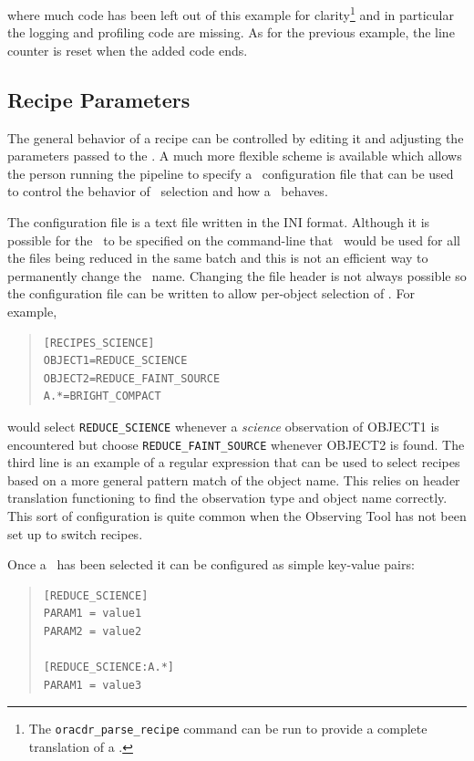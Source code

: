 \documentclass[final,authoryear,5p,times,twocolumn]{elsarticle}
\begin{document}
where much code has been left out of this example for
clarity\footnote{The \texttt{oracdr\_parse\_recipe} command can be run
to provide a complete translation of a \recipe.} and in particular the
logging and profiling code are missing. As for the previous example,
the line counter is reset when the added code ends.

\subsection{Recipe Parameters}

The general behavior of a recipe can be controlled by editing it and
adjusting the parameters passed to the \primitives. A much more
flexible scheme is available which allows the person running the
pipeline to specify a \recipe\ configuration file that can be used to
control the behavior of \recipe\ selection and how a \recipe\ behaves.

The configuration file is a text file written in the INI
format. Although it is possible for the \recipe\ to be specified on
the command-line that \recipe\ would be used for all the files being
reduced in the same batch and this is not an efficient way to
permanently change the \recipe\ name. Changing the file header is not
always possible so the configuration file can be written to allow
per-object selection of \recipes. For example,

\begin{quote}
\begin{verbatim}
[RECIPES_SCIENCE]
OBJECT1=REDUCE_SCIENCE
OBJECT2=REDUCE_FAINT_SOURCE
A.*=BRIGHT_COMPACT
\end{verbatim}
\end{quote}

would select \texttt{REDUCE\_SCIENCE} whenever a \emph{science}
observation of OBJECT1 is encountered but choose
\texttt{REDUCE\_FAINT\_SOURCE} whenever OBJECT2 is found. The third
line is an example of a regular expression that can be used to select
recipes based on a more general pattern match of the object name. This relies
on header translation functioning to find the observation type and
object name correctly. This sort of configuration is quite common when the
Observing Tool has not been set up to switch recipes.

Once a \recipe\ has been selected it can be configured as simple
key-value pairs:

\begin{quote}
\begin{verbatim}
[REDUCE_SCIENCE]
PARAM1 = value1
PARAM2 = value2

[REDUCE_SCIENCE:A.*]
PARAM1 = value3
\end{verbatim}
\end{quote}
\end{document}
